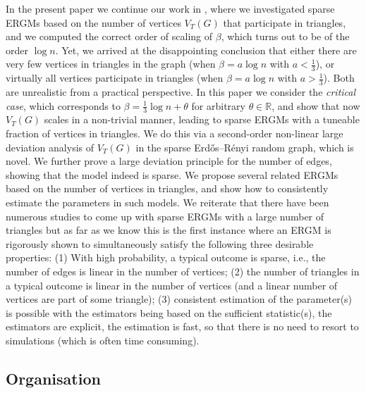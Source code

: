 \documentclass[bj,authoryear,noshowframe]{imsart}
\numberwithin{equation}{section}
\theoremstyle{plain}
\theoremstyle{definition}
\newcommand{\erdos}{Erd\H{o}s--R\'enyi random graph}
\begin{document}
In the present paper we continue our work in \cite{ChaHofHol21}, where we investigated sparse ERGMs based on the number of vertices $V_{T}(G)$ that participate in triangles, and we computed the correct order of scaling of $\beta$, which turns out to be of the order $\log n$. Yet, we arrived at the disappointing conclusion that either there are very few vertices in triangles in the graph (when $\beta =a \log n$ with $a<\tfrac{1}{3}$), or virtually all vertices participate in triangles (when $\beta = a\log n$ with $a>\tfrac{1}{3}$). Both are unrealistic from a practical perspective. In this paper we consider the {\em critical case}, which corresponds to $\beta=\tfrac{1}{3} \log{n} + \theta$ for arbitrary $\theta\in {\mathbb R}$, and show that now $V_{T}(G)$ scales in a non-trivial manner, leading to sparse ERGMs with a tuneable fraction of vertices in triangles. We do this via a second-order non-linear large deviation analysis of $V_{T}(G)$ in the sparse \erdos, which is novel. We further prove a large deviation principle for the number of edges, showing that the model indeed is sparse. We propose several related ERGMs based on the number of vertices in triangles, and show how to consistently estimate the parameters in such models. We reiterate that there have been numerous studies to come up with sparse ERGMs \cite{frank1986markov, handcock2003assessing, holland1981exponential, hunter2006inference, snijders2006new} with a large number of triangles but as far as we know this is the first instance where an  ERGM is rigorously shown to simultaneously satisfy the following three desirable properties: (1) With high probability, a typical outcome is sparse, i.e., the number of edges is linear in the number of vertices; (2) the number of triangles in a typical outcome is linear in the number of vertices  (and a linear number of vertices are part of some triangle); (3) consistent estimation of the parameter(s) is possible with the estimators being based on the sufficient statistic(s), the estimators are explicit, the estimation is fast, so that there is no need to resort to simulations (which is often time consuming).


\subsection{Organisation}
 
\end{document}
